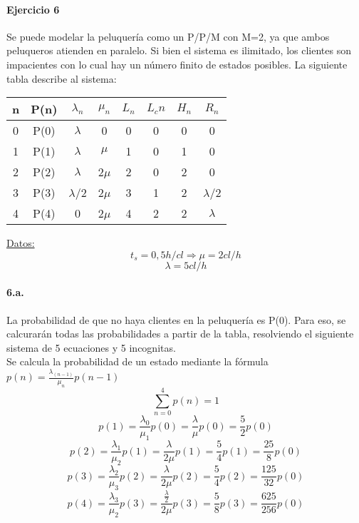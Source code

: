 \documentclass{article}
\begin{document}
\paragraph{Ejercicio 6}
    Se puede modelar la peluquería como un P/P/M con M=2, ya que ambos peluqueros atienden en paralelo. Si bien el sistema es ilimitado, los clientes son impacientes con lo cual hay un número finito de estados posibles.
    La siguiente tabla describe al sistema:
    \begin{center}
    \begin{tabular}{|| c | c | c | c | c | c | c | c ||}
    \hline 
     n & P(n) & $\lambda_n$ & $\mu_n$ & $L_n$& $L_cn$ & $H_n$ & $R_n$ \\ \hline \hline
     0 & P(0) & $\lambda$   & 0       & 0    & 0      & 0     & 0	\\ \hline
     1 & P(1) & $\lambda$   & $\mu$   & 1    & 0      & 1     & 0	\\ \hline
     2 & P(2) & $\lambda$   & 2$\mu$  & 2    & 0      & 2     & 0	\\ \hline
     3 & P(3) & $\lambda$/2 & 2$\mu$  & 3    & 1      & 2     & $\lambda$/2 \\ \hline
     4 & P(4) & 0           & 2$\mu$  & 4    & 2      & 2     & $\lambda$   \\ \hline  
     
    \end{tabular}
    \end{center}
    \underline{Datos:} \\
    $$t_s = 0,5 h/cl  \Rightarrow \mu = 2 cl/h $$
    $$\lambda = 5 cl/h $$
    
    \paragraph{6.a.} La probabilidad de que no haya clientes en la peluquería es P(0). Para eso, se calcurarán todas las probabilidades a partir de la tabla,
    resolviendo el siguiente sistema de 5 ecuaciones y 5 incognitas.\\
    Se calcula la probabilidad de un estado mediante la fórmula $p(n) = \frac{\lambda_(n-1)}{\mu_n} p(n-1)$
    $$ \sum_{n=0}^{4} p(n) = 1 $$
    $$ p(1) = \frac{\lambda_0}{\mu_1}p(0) = \frac{\lambda}{\mu}p(0) = \frac{5}{2}p(0)$$
    $$ p(2) = \frac{\lambda_1}{\mu_2}p(1) = \frac{\lambda}{2\mu}p(1) = \frac{5}{4}p(1) = \frac{25}{8}p(0)$$
    $$ p(3) = \frac{\lambda_2}{\mu_3}p(2) = \frac{\lambda}{2\mu}p(2) = \frac{5}{4}p(2) = \frac{125}{32}p(0)$$
    $$ p(4) = \frac{\lambda_3}{\mu_2}p(3) = \frac{\frac{\lambda}{2}}{2\mu}p(3) = \frac{5}{8}p(3) = \frac{625}{256}p(0)$$
    
\end{document}
